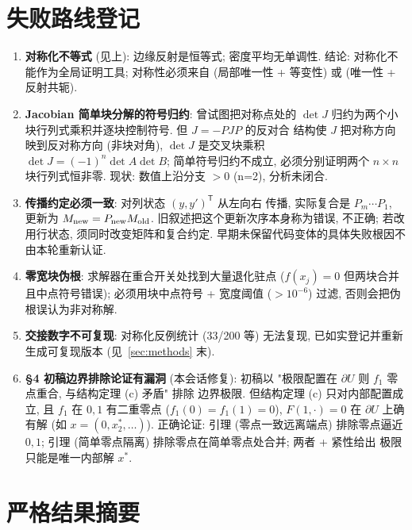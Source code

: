\documentclass[UTF8]{ctexart}
\begin{document}
\section{失败路线登记}\label{sec:failures}

\begin{enumerate}
	\item \textbf{对称化不等式} (见上): 边缘反射是恒等式; 密度平均无单调性.
	结论: 对称化不能作为全局证明工具; 对称性必须来自 (局部唯一性 + 等变性)
	或 (唯一性 + 反射共轭).
	\item \textbf{Jacobian 简单块分解的符号归约}: 曾试图把对称点处的
	$\det J$ 归约为两个小块行列式乘积并逐块控制符号. 但 $J=-PJP$ 的反对合
	结构使 $J$ 把对称方向映到反对称方向 (非块对角), $\det J$ 是交叉块乘积
	$\det J=(-1)^n\det A\det B$; 简单符号归约不成立, 必须分别证明两个
	$n\times n$ 块行列式恒非零. 现状: 数值上沿分支 $>0$ (n=2), 分析未闭合.
	\item \textbf{传播约定必须一致}: 对列状态 $(y,y')^{\mathsf T}$ 从左向右
传播, 实际复合是 $P_m\cdots P_1$, 更新为 $M_{\rm new}=P_{\rm new}M_{\rm old}$.
旧叙述把这个更新次序本身称为错误, 不正确; 若改用行状态, 须同时改变矩阵和复合约定.
早期未保留代码变体的具体失败根因不由本轮重新认证.
	\item \textbf{零宽块伪根}: 求解器在重合开关处找到大量退化驻点
	($f(x_j)=0$ 但两块合并且中点符号错误); 必须用块中点符号 + 宽度阈值
	($>10^{-6}$) 过滤, 否则会把伪根误认为非对称解.
	\item \textbf{交接数字不可复现}: 对称化反例统计 (33/200 等) 无法复现,
	已如实登记并重新生成可复现版本 (见~\ref{sec:methods} 末).
	\item \textbf{§4 初稿边界排除论证有漏洞} (本会话修复): 初稿以
	"极限配置在 $\partial U$ 则 $f_1$ 零点重合, 与结构定理 (c) 矛盾" 排除
	边界极限. 但结构定理 (c) 只对内部配置成立, 且 $f_1$ 在 $0,1$ 有二重零点
	($f_1(0)=f_1(1)=0$), $F(1,\cdot)=0$ 在 $\partial U$ 上确有解 (如
	$x=(0,x_2^*,\dots)$). 正确论证: 引理 (零点一致远离端点) 排除零点逼近
	$0,1$; 引理 (简单零点隔离) 排除零点在简单零点处合并; 两者 + 紧性给出
	极限只能是唯一内部解 $x^*$.
\end{enumerate}

\section{严格结果摘要}\label{sec:strict}
\end{document}
